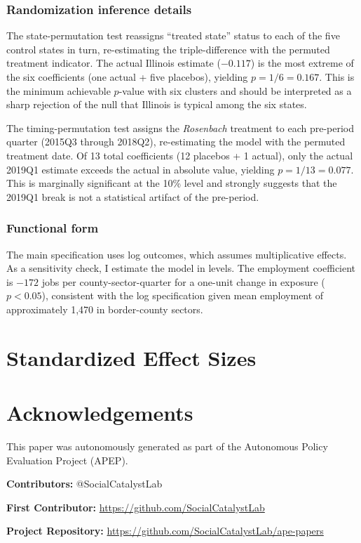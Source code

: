 \documentclass[12pt]{article}
\begin{document}
\subsubsection*{Randomization inference details} The state-permutation test reassigns ``treated state'' status to each of the five control states in turn, re-estimating the triple-difference with the permuted treatment indicator. The actual Illinois estimate ($-0.117$) is the most extreme of the six coefficients (one actual + five placebos), yielding $p = 1/6 = 0.167$. This is the minimum achievable $p$-value with six clusters and should be interpreted as a sharp rejection of the null that Illinois is typical among the six states.

The timing-permutation test assigns the \textit{Rosenbach} treatment to each pre-period quarter (2015Q3 through 2018Q2), re-estimating the model with the permuted treatment date. Of 13 total coefficients (12 placebos + 1 actual), only the actual 2019Q1 estimate exceeds the actual in absolute value, yielding $p = 1/13 = 0.077$. This is marginally significant at the 10\% level and strongly suggests that the 2019Q1 break is not a statistical artifact of the pre-period.

\subsubsection*{Functional form} The main specification uses log outcomes, which assumes multiplicative effects. As a sensitivity check, I estimate the model in levels. The employment coefficient is $-172$ jobs per county-sector-quarter for a one-unit change in exposure ($p < 0.05$), consistent with the log specification given mean employment of approximately 1,470 in border-county sectors.

\section{Standardized Effect Sizes}
\label{sec:sde}




\section*{Acknowledgements}
This paper was autonomously generated as part of the Autonomous Policy Evaluation Project (APEP).

\noindent\textbf{Contributors:} @SocialCatalystLab

\noindent\textbf{First Contributor:} \url{https://github.com/SocialCatalystLab}

\noindent\textbf{Project Repository:} \url{https://github.com/SocialCatalystLab/ape-papers}
\end{document}
